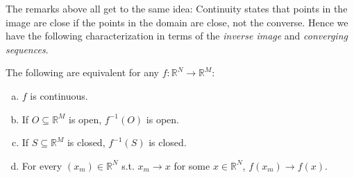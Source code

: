 \documentclass{article}
\begin{document}
The remarks above all get to the same idea: Continuity states that points in the image are close if the points in the domain are close, not the converse. Hence we have the following characterization in terms of the \textit{inverse image} and \textit{converging sequences}.
\begin{theorem}\label{thm:lecture2_continuity_open_closed}
  The following are equivalent for any $f: \mathbb{R}^N \to \mathbb{R}^M$:
  \begin{enumerate}[a)]
    \item $f$ is continuous.

    \item If $O \subseteq \mathbb{R}^M$ is open, $f^{-1}(O)$ is open.

    \item If $S \subseteq \mathbb{R}^M$ is closed, $f^{-1}(S)$ is closed.

    \item For every $(x_m) \in \mathbb{R}^N$ s.t. $x_m \to x$ for some $x \in \mathbb{R}^N$, $f(x_m) \to f(x)$.
  \end{enumerate}
\end{theorem}
\end{document}
